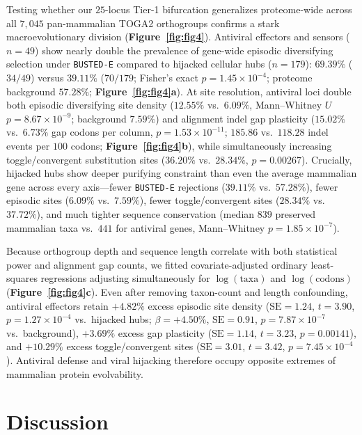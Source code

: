 \documentclass[11pt,letterpaper]{article}
\newcommand{\BUSTEDE}{\texttt{BUSTED-E}\xspace}
\begin{document}
Testing whether our $25$-locus Tier-1 bifurcation generalizes proteome-wide across all $7,045$ pan-mammalian TOGA2 orthogroups confirms a stark macroevolutionary division (\textbf{Figure~\ref{fig:fig4}}). Antiviral effectors and sensors ($n = 49$) show nearly double the prevalence of gene-wide episodic diversifying selection under \BUSTEDE compared to hijacked cellular hubs ($n = 179$): $69.39\%$ ($34/49$) versus $39.11\%$ ($70/179$; Fisher's exact $p = 1.45 \times 10^{-4}$; proteome background $57.28\%$; \textbf{Figure~\ref{fig:fig4}a}). At site resolution, antiviral loci double both episodic diversifying site density ($12.55\%$ vs.\ $6.09\%$, Mann--Whitney $U$ $p = 8.67 \times 10^{-9}$; background $7.59\%$) and alignment indel gap plasticity ($15.02\%$ vs.\ $6.73\%$ gap codons per column, $p = 1.53 \times 10^{-11}$; $185.86$ vs.\ $118.28$ indel events per $100$ codons; \textbf{Figure~\ref{fig:fig4}b}), while simultaneously increasing toggle/convergent substitution sites ($36.20\%$ vs.\ $28.34\%$, $p = 0.00267$). Crucially, hijacked hubs show deeper purifying constraint than even the average mammalian gene across every axis---fewer \BUSTEDE rejections ($39.11\%$ vs.\ $57.28\%$), fewer episodic sites ($6.09\%$ vs.\ $7.59\%$), fewer toggle/convergent sites ($28.34\%$ vs.\ $37.72\%$), and much tighter sequence conservation (median $839$ preserved mammalian taxa vs.\ $441$ for antiviral genes, Mann--Whitney $p = 1.85 \times 10^{-7}$).

Because orthogroup depth and sequence length correlate with both statistical power and alignment gap counts, we fitted covariate-adjusted ordinary least-squares regressions adjusting simultaneously for $\log(\text{taxa})$ and $\log(\text{codons})$ (\textbf{Figure~\ref{fig:fig4}c}). Even after removing taxon-count and length confounding, antiviral effectors retain $+4.82\%$ excess episodic site density ($\mathrm{SE} = 1.24$, $t = 3.90$, $p = 1.27 \times 10^{-4}$ vs.\ hijacked hubs; $\beta = +4.50\%$, $\mathrm{SE} = 0.91$, $p = 7.87 \times 10^{-7}$ vs.\ background), $+3.69\%$ excess gap plasticity ($\mathrm{SE} = 1.14$, $t = 3.23$, $p = 0.00141$), and $+10.29\%$ excess toggle/convergent sites ($\mathrm{SE} = 3.01$, $t = 3.42$, $p = 7.45 \times 10^{-4}$). Antiviral defense and viral hijacking therefore occupy opposite extremes of mammalian protein evolvability.

\FloatBarrier

\section{Discussion}
\end{document}
